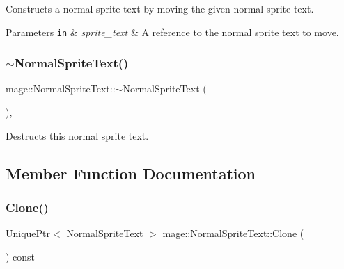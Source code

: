 Constructs a normal sprite text by moving the given normal sprite text.


\begin{DoxyParams}[1]{Parameters}
\mbox{\tt in}  & {\em sprite\+\_\+text} & A reference to the normal sprite text to move. \\
\hline
\end{DoxyParams}
\hypertarget{classmage_1_1_normal_sprite_text_ae8575ab8ece5b8b923509fc7ab4d3dea}{}\label{classmage_1_1_normal_sprite_text_ae8575ab8ece5b8b923509fc7ab4d3dea} 
\subsubsection{\texorpdfstring{$\sim$\+Normal\+Sprite\+Text()}{~NormalSpriteText()}}
{\footnotesize\ttfamily mage\+::\+Normal\+Sprite\+Text\+::$\sim$\+Normal\+Sprite\+Text (\begin{DoxyParamCaption}{ }\end{DoxyParamCaption})\hspace{0.3cm}{\ttfamily [virtual]}, {\ttfamily [default]}}

Destructs this normal sprite text. 

\subsection{Member Function Documentation}
\hypertarget{classmage_1_1_normal_sprite_text_a8357ea517cff639204da4825024d9d34}{}\label{classmage_1_1_normal_sprite_text_a8357ea517cff639204da4825024d9d34} 
\subsubsection{\texorpdfstring{Clone()}{Clone()}}
{\footnotesize\ttfamily \hyperlink{namespacemage_a8c307fbcc33bce9b7f2aa4c26c3b95cf}{Unique\+Ptr}$<$ \hyperlink{classmage_1_1_normal_sprite_text}{Normal\+Sprite\+Text} $>$ mage\+::\+Normal\+Sprite\+Text\+::\+Clone (\begin{DoxyParamCaption}{ }\end{DoxyParamCaption}) const}

